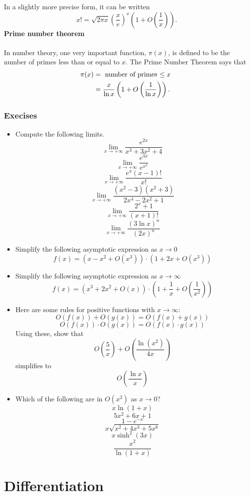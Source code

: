 \documentclass[twoside,openright,titlepage,a4paper]{book}
\begin{document}
\begin{sloppypar}
In a slightly more precise form, it can be written \[ x! = \sqrt{2\pi x} \left(\frac{x}{e}\right)^x \left(1+O\left(\frac{1}{x}\right)\right). \]
\bigbreak
\noindent \textbf{Prime number theorem}\\\\
In number theory, one very important function, $\pi(x)$, is defined to be the number of primes less than or equal to $x$. The Prime Number Theorem says that
\begin{align*}
\pi(x) &= \hbox{ number of primes $\leq x$ } \\
&= \frac{x}{\ln x} \left(1 + O\left(\frac{1}{\ln x}\right)\right).
\end{align*}

\subsection{Execises}
\begin{itemize}
\item Compute the following limits.
\[\displaystyle \lim_{x \to +\infty} \frac{e^{2x}}{x^3 + 3x^2 +4}\]
\[\displaystyle \lim_{x \rightarrow +\infty} \frac{e^{3x}}{e^{x^2}}\]
\[\displaystyle \lim_{x \rightarrow +\infty} \frac {e^x (x-1)!}{x!}\]
\[\displaystyle \lim_{x \rightarrow +\infty} \frac {(x^2-3)(x^2+3)}{2x^4-2x^2+1}\]
\[\displaystyle \lim_{x \to +\infty} \frac{2^x + 1}{(x+1)!}\]
\[\displaystyle \lim_{x \to +\infty} \frac{(3 \ln x)^n}{(2x)^n}\]
\item Simplify the following asymptotic expression as $x\to 0$ \[ f(x) = \left( x - x^2 + O(x^3)\right)\cdot\left(1+2x + O(x^3)\right) \]
\item Simplify the following asymptotic expression as $x\to \infty$ \[ f(x) =\left( x^3 + 2x^2 + O(x)\right)\cdot\left(1+\frac{1}{x}+O\left(\frac{1}{x^2}\right)\right) \]
\item Here are some rules for positive functions with $x\to\infty$: \[ O(f(x)) + O(g(x)) = O(f(x) + g(x)) \] \[ O(f(x))\cdot O(g(x)) = O(f(x)\cdot g(x))\]
Using these, show that \[ O\left(\frac{5}{x}\right) + O\left(\frac{\ln(x^2)}{4x}\right) \] simplifies to \[ \displaystyle O\left(\frac{\ln x}{x}\right) \]
\item Which of the following are in $O(x^2)$ as $x \to 0 $? \[x \ln(1+x) \] \[ 5x^2+6x+1 \] \[1-e^{-x} \] \[ x \sqrt{x^2+4x^3+5x^6} \] \[x \sinh^2(3x) \] \[\frac{x^2}{\ln(1+x)} \]
\end{itemize}

\chapter{Differentiation} \label{ChDifferentiation}

\end{sloppypar}
\end{document}
